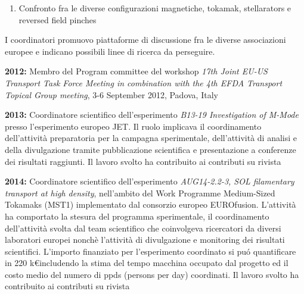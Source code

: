 \begin{enumerate}[label={[E\arabic*]}]
\begin{enumerate}[noitemsep,leftmargin=*,topsep=0pt,partopsep=0pt]
    trasporto che includano effetti di campi magnetici non
    assial-simmetrici.
  \item Confronto fra le diverse configurazioni magnetiche, tokamak,
    stellarators e reversed field pinches
  \end{enumerate}
  I coordinatori promuovo piattaforme di discussione fra le diverse
  associazioni europee e indicano possibili linee di ricerca da
  perseguire.
%
\item \textbf{2012:} Membro del Program committee del workshop
  \emph{17th Joint EU-US Transport Task Force Meeting in combination
    with the 4th EFDA Transport Topical Group meeting}, 3-6 September
  2012, Padova, Italy
%
\item \textbf{2013:} Coordinatore scientifico dell'esperimento
  \emph{B13-19 Investigation of M-Mode} presso l'esperimento europeo
  JET. Il ruolo implicava il coordinamento dell'attivit{\`a}
  preparatoria per la campagna sperimentale, dell'attivit{\`a} di
  analisi e della divulgazione tramite pubblicazione scientifica e
  presentazione a conferenze dei risultati raggiunti. Il lavoro svolto
  ha contribuito ai contributi su rivista  \cite{Solano:2017db,Refy:NuclearFusion2020}
%  
\item \textbf{2014:} Coordinatore scientifico dell'esperimento
  \emph{AUG14-2.2-3, SOL filamentary transport at high density},
  nell'ambito del Work Programme Medium-Sized Tokamaks (MST1)
  implementato dal consorzio europeo EUROfusion. L'attivit{\`a} ha
  comportato la stesura del programma sperimentale, il coordinamento
  dell'attivit{\`a} svolta dal team scientifico che coinvolgeva
  ricercatori da diversi laboratori europei nonch{\`e} l'attivit{\`a}
  di divulgazione e monitoring dei risultati scientifici.
  L'importo finanziato per l'esperimento
  coordinato si pu\'o quantificare in 220 k\euro includendo la stima
  del tempo macchina occupato dal progetto ed il costo
  medio del numero di ppds (persons per day) coordinati. Il lavoro svolto
  ha contribuito ai contributi su rivista \cite{Carralero:2016fs, Carralero:prl2015, Carralero:2017gb}


\end{enumerate}

